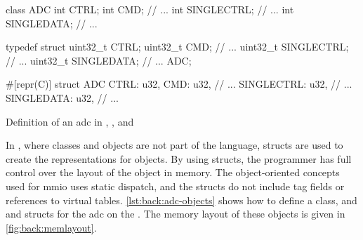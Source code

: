 \begin{listing}[H]
  \centering
  \begin{minipage}{0.26\textwidth}
  \begin{listing}
    \begin{javacode}
class ADC {
  int CTRL;
  int CMD;
  // ...
  int SINGLECTRL;
  // ...
  int SINGLEDATA;
  // ...
}
    \end{javacode}
  \end{listing}
  \end{minipage}
  \hfill
  \begin{minipage}{0.33\textwidth}
  \begin{listing}
    \begin{ccode}
typedef struct {
  uint32_t CTRL;
  uint32_t CMD;
  // ...
  uint32_t SINGLECTRL;
  // ...
  uint32_t SINGLEDATA;
  // ...
} ADC;
    \end{ccode}
  \end{listing}
  \end{minipage}
  \hfill
  \begin{minipage}{0.27\textwidth}
  \begin{listing}
    \begin{rustcode}
#[repr(C)]
struct ADC {
  CTRL: u32,
  CMD: u32,
  // ...
  SINGLECTRL: u32,
  // ...
  SINGLEDATA: u32,
  // ...
}
    \end{rustcode}
  \end{listing}
  \end{minipage}

  \caption{Definition of an \gls{adc} in {\Java}, {\rust}, and {\C}}
  \label{lst:back:adc-objects}
\end{listing}

In {\C}, where classes and objects are not part of the language, structs are used to create the representations for objects.
By using structs, the programmer has full control over the layout of the object in memory.
The object-oriented concepts used for \gls{mmio} uses static dispatch, and the structs do not include tag fields or references to virtual tables.
\autoref{lst:back:adc-objects} shows how to define a {\Java} class, and {\rust} and {\C} structs for the \gls{adc} on the {\gecko}.
The memory layout of these objects is given in \autoref{fig:back:memlayout}.

